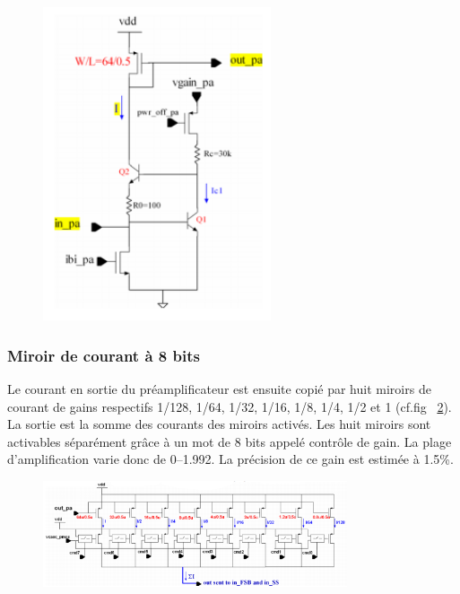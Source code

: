 \begin{figure}[th!]
	\centering
	\includegraphics[width=0.60\textwidth]{GLA/preampli.png}
	\label{preampli}
\end{figure}

\subsubsection{Miroir de courant à 8 bits}
Le courant en sortie du préamplificateur est ensuite copié par huit miroirs de courant de gains respectifs 1/128, 1/64, 1/32, 1/16, 1/8, 1/4, 1/2 et 1 (cf.fig~ \ref{mirror}). La sortie est la somme des courants des miroirs activés. Les huit miroirs sont activables séparément grâce à un mot de \num{8} bits appelé contrôle de gain. La plage d'amplification varie donc de \SIrange{0}{1.992}{}. La précision de ce gain est estimée à 1.5\%. 

\begin{figure}[ht!]
	\centering
	\includegraphics[width=0.8\textwidth]{GLA/miror.png}
	\label{mirror}
\end{figure}


